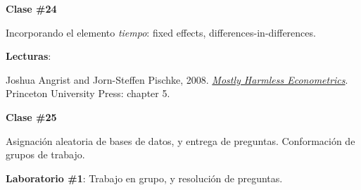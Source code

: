 \documentclass[letterpaper]{article}
\renewenvironment{itemize}{
  \begin{list}{}{
    \setlength{\leftmargin}{1.5em}
  }
}{
  \end{list}
}
\begin{document}
\begin{enumerate}
      \begin{itemize} 
        \item[$\bullet$] {\bf Clase \#24}
          \begin{itemize} 
            \item[$\circ$] Incorporando el elemento \emph{tiempo}: fixed effects, differences-in-differences.
            \item[$\circ$] {\bf Lecturas}: 
              \begin{itemize}
                \item[$\diamond$] Joshua Angrist and Jorn-Steffen Pischke, 2008. \href{https://github.com/hbahamonde/Metodos_Cuanti_I/raw/master/Readings/MHE.pdf}{\emph{Mostly Harmless Econometrics}}. Princeton University Press: chapter 5.
              \end{itemize}
          \end{itemize}
      \end{itemize}


			\begin{itemize} 
				\item[$\bullet$] {\bf Clase \#25}
					\begin{itemize} 
						\item[$\circ$] Asignaci\'on aleatoria de bases de datos, y entrega de preguntas. Conformaci\'on de grupos de trabajo.
						\item[$\circ$] {\bf Laboratorio \#1}: Trabajo en grupo, y resoluci\'on de preguntas.
					\end{itemize}
			\end{itemize}








\end{enumerate}
\end{document}
